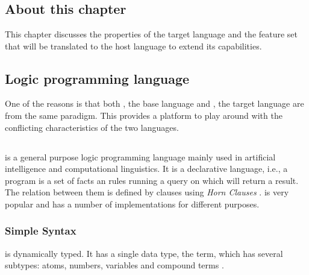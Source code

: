 \documentclass[thesis-solanki.tex]{subfiles}
\begin{document}
\chapter{}\label{chap:pwp}


\section{About this chapter}

This chapter discusses the properties of the target language  and the feature set that will be translated to the host 
language to extend its capabilities.

\section{Logic programming language}


One of the reasons is that both , the base language and , the target language are from the same paradigm.
This provides a platform to play around with the conflicting characteristics of the two languages.

\section{}
 is a general purpose logic programming language mainly used in artificial intelligence and
  computational linguistics.
  It is a declarative language, i.e., a program is a set of facts an rules running a
  query on which will return a result.
  The relation between them is defined by clauses using \textit{Horn Clauses} \cite{wikiprolog}.
   is very popular and has a number of implementations
  \cite{website:comparisonofprologimplementationswiki} for different purposes.

\subsection{Simple Syntax}

 is dynamically typed. It has a single data type, the term, which has several subtypes: atoms, numbers, variables and 
compound terms \cite{wikiprolog}.
\end{document}
